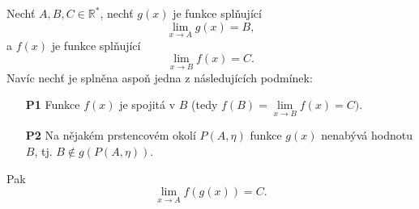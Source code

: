 \begin{theorem}
	Nechť $A, B, C \in \mathbb{R}^*$,
	nechť $g(x)$ je funkce splňující
	$$\lim_{x \rightarrow A} g(x) = B,$$ 
	a $f(x)$ je funkce splňující
	$$\lim_{x \rightarrow B} f(x) = C.$$ 
	Navíc nechť je splněna aspoň jedna z následujících podmínek:
	\begin{itemize}

		\item[\textbf{P1}]  Funkce $f(x)$ je spojitá v $B$ (tedy $f(B) = \underset{x \rightarrow B}{\lim} f(x) = C)$.
		
		\item[\textbf{P2}]  Na nějakém prstencovém okolí $P(A, \eta)$ funkce $g(x)$ nenabývá hodnotu $B$, tj. $B \not\in g(P(A, \eta))$.

	\end{itemize}
	Pak
	$$\lim_{x \rightarrow A} f(g(x)) = C.$$
	\label{thm:limita_slozene_fce}
\end{theorem}

